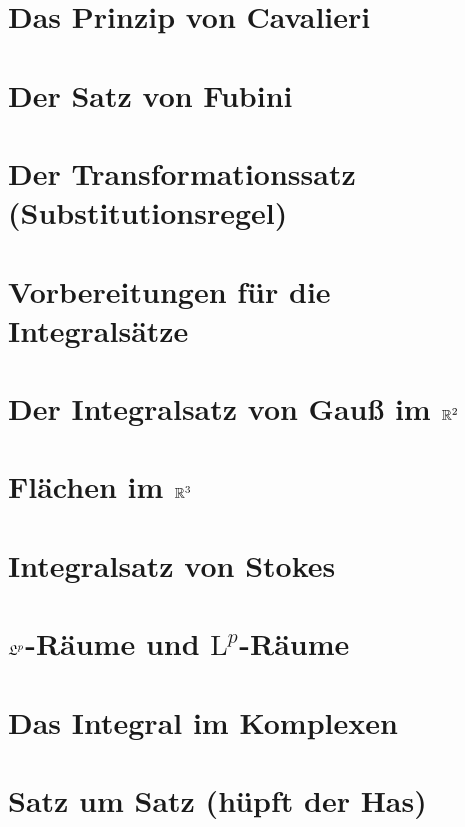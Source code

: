 \documentclass[a4paper,oneside,DIV15,BCOR12mm]{scrbook}
\begin{document}
\chapter{Das Prinzip von Cavalieri}
\label{Kapitel 9}


\chapter{Der Satz von Fubini}
\label{Kapitel 10}


\chapter{Der Transformationssatz (Substitutionsregel)}
\label{Kapitel 11}


\chapter{Vorbereitungen für die Integralsätze}
\label{Kapitel 12}


\chapter{Der Integralsatz von Gauß im $\mathbb{R}^2$}
\label{Kapitel 13}


\chapter{Flächen im $\mathbb{R}^3$}
\label{Kapitel 14}


\chapter{Integralsatz von Stokes}
\label{Kapitel 15}


\chapter{$\mathfrak{L}^{p}$-Räume und $\mathrm{L}^{p}$-Räume}
\label{Kapitel 16}


\chapter{Das Integral im Komplexen}
\label{Kapitel 17}


\appendix
\chapter{Satz um Satz (hüpft der Has)}
\end{document}
